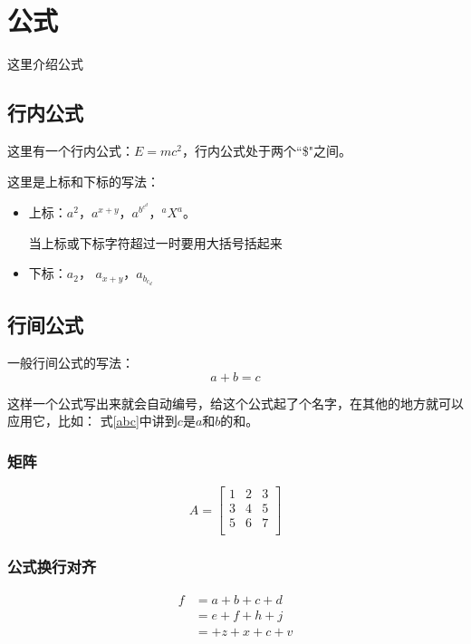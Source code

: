 \section{公式}
这里介绍公式
\subsection{行内公式}
这里有一个行内公式：$E=mc^2$，行内公式处于两个``\$"之间。

这里是上标和下标的写法：
\begin{itemize}
  \item 上标：$a^2$，$a^{x+y}$，$a^{b^{c^d}}$，$^aX^a$。

  当上标或下标字符超过一时要用大括号括起来
  \item 下标：$a_2$， $a_{x+y}$，$a_{b_{c_d}}$
\end{itemize} 

\subsection{行间公式}
一般行间公式的写法：
\begin{equation}
  a+b=c
  \label{abc}
\end{equation}

这样一个公式写出来就会自动编号，\text{\label{abc}}给这个公式起了个名字，在其他的地方就可以应用它，比如： 式\ref{abc}中讲到$c$是$a$和$b$的和。
\subsubsection{矩阵}
\begin{equation}
A=
 \left[
  \begin{array}{ccc}%
    1 & 2 & 3\\
    3 & 4 & 5\\
    5 & 6 & 7\\
  \end{array}
  \right]
\end{equation}

\subsubsection{公式换行对齐}
\begin{equation}
  \begin{aligned}
  f&=a+b+c+d\\%
   &=e+f+h+j\\
   &=+z+x+c+v\\
  \end{aligned}
\end{equation}